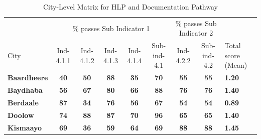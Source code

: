 \documentclass[
]{report}
\begin{document}
\begingroup\fontsize{8}{10}\selectfont

\begin{longtable}[t]{>{\centering\arraybackslash}p{.5in}>{}c>{}c>{}c>{}c>{}c>{}c>{}c>{\centering\arraybackslash}p{.4in}}
\caption{\label{tab:matrix}City-Level Matrix for HLP and Documentation Pathway}\\
\toprule
\multicolumn{1}{c}{ } & \multicolumn{5}{c}{\% passes Sub Indicator 1} & \multicolumn{2}{c}{\% passes Sub Indicator 2} & \multicolumn{1}{c}{ } \\
\cmidrule(l{3pt}r{3pt}){2-6} \cmidrule(l{3pt}r{3pt}){7-8}
City & Ind-4.1.1 & Ind-4.1.2 & Ind-4.1.3 & Ind-4.1.4 & Sub-ind-4.1 & Ind-4.2.2 & Sub-ind-4.2 & Total score (Mean)\\
\midrule
\textbf{Baardheere} & \textcolor[HTML]{440154}{\textbf{\textbf{40}}} & \textcolor[HTML]{355F8D}{\textbf{\textbf{50}}} & \textcolor[HTML]{FDE725}{\textbf{\textbf{88}}} & \textcolor[HTML]{440154}{\textbf{\textbf{35}}} & \textcolor[HTML]{482576}{\textbf{\textbf{70}}} & \textcolor[HTML]{3B528B}{\textbf{\textbf{55}}} & \textcolor[HTML]{3B528B}{\textbf{\textbf{55}}} & \textcolor[HTML]{306A8E}{\textbf{1.20}}\\
\textbf{Baydhaba} & \textcolor[HTML]{34618D}{\textbf{\textbf{56}}} & \textcolor[HTML]{25AB82}{\textbf{\textbf{67}}} & \textcolor[HTML]{50C46A}{\textbf{\textbf{80}}} & \textcolor[HTML]{B2DD2D}{\textbf{\textbf{66}}} & \textcolor[HTML]{50C46A}{\textbf{\textbf{88}}} & \textcolor[HTML]{50C46A}{\textbf{\textbf{76}}} & \textcolor[HTML]{50C46A}{\textbf{\textbf{76}}} & \textcolor[HTML]{1F9F88}{\textbf{1.40}}\\
\textbf{Berdaale} & \textcolor[HTML]{BDDF26}{\textbf{\textbf{87}}} & \textcolor[HTML]{440154}{\textbf{\textbf{34}}} & \textcolor[HTML]{20A486}{\textbf{\textbf{76}}} & \textcolor[HTML]{22A884}{\textbf{\textbf{56}}} & \textcolor[HTML]{440154}{\textbf{\textbf{67}}} & \textcolor[HTML]{3E4C8A}{\textbf{\textbf{54}}} & \textcolor[HTML]{3E4C8A}{\textbf{\textbf{54}}} & \textcolor[HTML]{440154}{\textbf{0.89}}\\
\textbf{Doolow} & \textcolor[HTML]{31B57B}{\textbf{\textbf{74}}} & \textcolor[HTML]{FDE725}{\textbf{\textbf{88}}} & \textcolor[HTML]{E7E419}{\textbf{\textbf{87}}} & \textcolor[HTML]{FDE725}{\textbf{\textbf{70}}} & \textcolor[HTML]{FDE725}{\textbf{\textbf{96}}} & \textcolor[HTML]{228B8D}{\textbf{\textbf{65}}} & \textcolor[HTML]{228B8D}{\textbf{\textbf{65}}} & \textcolor[HTML]{1F9F88}{\textbf{1.40}}\\
\textbf{Kismaayo} & \textcolor[HTML]{1F9E89}{\textbf{\textbf{69}}} & \textcolor[HTML]{470E61}{\textbf{\textbf{36}}} & \textcolor[HTML]{440154}{\textbf{\textbf{59}}} & \textcolor[HTML]{8BD646}{\textbf{\textbf{64}}} & \textcolor[HTML]{481B6D}{\textbf{\textbf{69}}} & \textcolor[HTML]{FDE725}{\textbf{\textbf{88}}} & \textcolor[HTML]{FDE725}{\textbf{\textbf{88}}} & \textcolor[HTML]{25AC82}{\textbf{1.45}}\\

\end{longtable}
\end{document}
